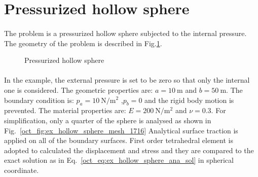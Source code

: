 \section{Pressurized hollow sphere}
\paragraph{}
The problem is a pressurized hollow sphere subjected to the internal pressure.
The geometry of the problem is described in Fig.\ref{oct_fig:ex_pre-hollow-sphere}. 

\begin{figure}[h!]
  \centering
  \caption{Pressurized hollow sphere}
  \label{oct_fig:ex_pre-hollow-sphere}
\end{figure}

\paragraph{}
In the example, the external pressure is set to be zero so that only the internal one is considered.
The geometric properties are: $a=\SI{10}{\meter}$ and $b=\SI{50}{\meter}$.
The boundary condition is: $p_a = \SI{10}{\newton \per \square \meter}$ ,$p_b = 0$ and the rigid body motion is prevented.
The material properties are: $E=\SI{200}{\newton \per \square \meter}$ and $\nu=0.3$.
For simplification, only a quarter of the sphere is analysed as shown in Fig.~\ref{oct_fig:ex_hollow_sphere_mesh_1716}
Analytical surface traction is applied on all of the boundary surfaces.
First order tetrahedral element is adopted to calculated the displacement and stress and they are compared to the exact solution as in Eq.~\ref{oct_eq:ex_hollow_sphere_ana_sol} in spherical coordinate.

